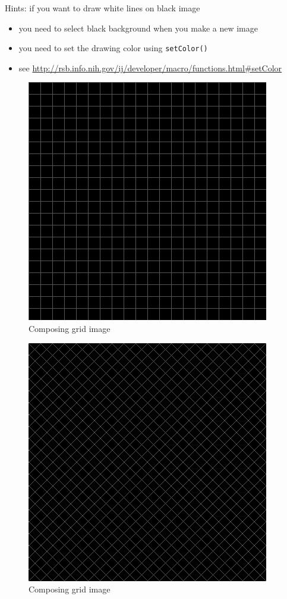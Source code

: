 \documentclass[11pt,a4paper,oneside]{report}
\newcommand{\ilcom}[1]{\texttt{\small#1}}
\begin{document}
Hints: if you want to draw white lines on black image
 \begin{itemize}
\item you need to select black background when you make a new image
\item you need to set the drawing color using \ilcom{setColor()}
\item see
\url{http://rsb.info.nih.gov/ij/developer/macro/functions.html#setColor}
\end{itemize}
\begin{figure}[htbp]
\begin{center}
\includegraphics[scale=0.6]{fig/grid.png}
\caption{Composing grid image}
\label{fig_homeworkGrid}
\end{center}
\end{figure}

\begin{figure}[htbp]
\begin{center}
\includegraphics[scale=0.6]{fig/gridDiagonal.png}
\caption{Composing grid image}
\label{fig_homeworkGridDiagonal}
\end{center}
\end{figure}
\end{document}
